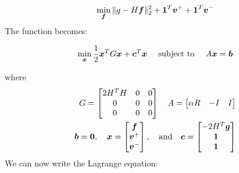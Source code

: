 \documentclass[12pt,a4paper,twoside]{report}
\begin{document}
{\begin{equation} 
\min_{\boldsymbol{f}}\Arrowvert g - H\boldsymbol{f}\Arrowvert_2^2+ 
\boldsymbol{1}^T \boldsymbol{v}^+ +\boldsymbol{1}^T \boldsymbol{v}^-
\end{equation}
The function becomes:

\begin{equation}
	\min_{\boldsymbol{x}}\frac{1}{2}\boldsymbol{x}^TG\boldsymbol{x} + \boldsymbol{c}^T\boldsymbol{x} \ \ \
	\textnormal{ subject to } \ \ \  A\boldsymbol{x} = \boldsymbol{b}
\end{equation}

where
\begin{equation} \label{lmnBigM}
	\begin{split}
	G = \begin{bmatrix}
	2H^TH & 0 & 0\\
	 0 & 0 & 0 \\
	 0 & 0& 0
	\end{bmatrix} \ \ \ 
	A = \begin{bmatrix}
	\alpha R & -I & I
	\end{bmatrix} \\
	\boldsymbol{b} = \boldsymbol{0} , \ \ \ 
	 \boldsymbol{x} = \begin{bmatrix}
	 \boldsymbol{f} \\ \boldsymbol{v}^+
 \\\boldsymbol{v}^-
 	 \end{bmatrix} ,\ \ \ \textnormal{and} \ \ \ 
 	  \boldsymbol{c} = \begin{bmatrix}
 	  -2H^T\boldsymbol{g} \\ \boldsymbol{1}
 	  \\\boldsymbol{1}
 	  \end{bmatrix}
 	\end{split} 
\end{equation}
We can now write the Lagrange equation:

}
\end{document}
